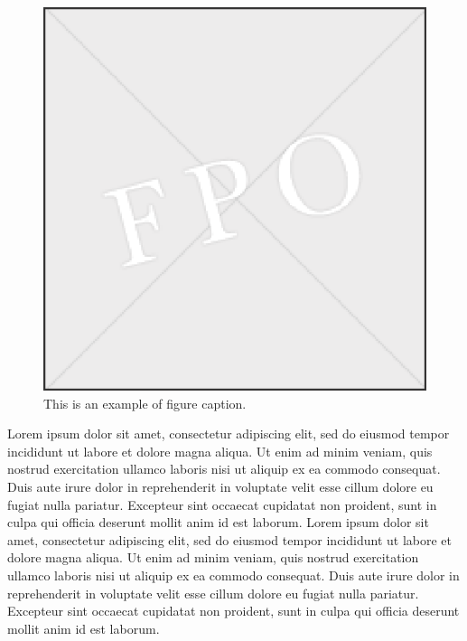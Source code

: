 \documentclass{sbc2025}%
\begin{document}
\begin{figure}
\begin{center}
\includegraphics{fpo.eps}
\caption{This is an example of figure caption.}\label{Fig1}
\end{center}
\end{figure}

Lorem ipsum dolor sit amet, consectetur adipiscing elit, sed do eiusmod tempor incididunt ut labore et dolore magna aliqua. Ut enim ad minim veniam, quis nostrud exercitation ullamco laboris nisi ut aliquip ex ea commodo consequat. Duis aute irure dolor in reprehenderit in voluptate velit esse cillum dolore eu fugiat nulla pariatur. Excepteur sint occaecat cupidatat non proident, sunt in culpa qui officia deserunt mollit anim id est laborum. Lorem ipsum dolor sit amet, consectetur adipiscing elit, sed do eiusmod tempor incididunt ut labore et dolore magna aliqua. Ut enim ad minim veniam, quis nostrud exercitation ullamco laboris nisi ut aliquip ex ea commodo consequat. Duis aute irure dolor in reprehenderit in voluptate velit esse cillum dolore eu fugiat nulla pariatur. Excepteur sint occaecat cupidatat non proident, sunt in culpa qui officia deserunt mollit anim id est laborum.
\end{document}
